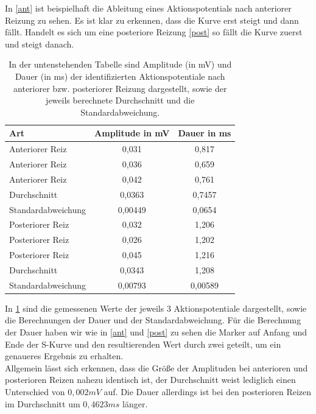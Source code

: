 \documentclass[11pt]{article}
\begin{document}
In \ref{ant} ist beispielhaft die Ableitung eines Aktionspotentials nach anteriorer Reizung zu sehen. Es ist klar zu erkennen, dass die Kurve erst steigt und dann fällt. Handelt es sich um eine posteriore Reizung \ref{post} so fällt die Kurve zuerst und steigt danach.

\begin{table}[H]
\caption{In der untenstehenden Tabelle sind Amplitude (in mV) und Dauer (in ms) der identifizierten Aktionspotentiale nach anteriorer bzw. posteriorer Reizung dargestellt, sowie der jeweils berechnete Durchschnitt und die Standardabweichung.}
\begin{center}
\begin{tabular}{l||c|c}
Art & Amplitude in mV & Dauer in ms \\
\hline\hline
Anteriorer Reiz & 0,031 & 0,817\\
Anteriorer Reiz & 0,036 & 0,659\\
Anteriorer Reiz & 0,042 & 0,761\\
\hline
Durchschnitt & 0,0363& 0,7457\\
Standardabweichung & 0,00449 &0,0654 \\
\hline\hline
Posteriorer Reiz & 0,032 & 1,206\\
Posteriorer Reiz & 0,026& 1,202\\
Posteriorer Reiz & 0,045 & 1,216\\
\hline
Durchschnitt & 0,0343 & 1,208\\
Standardabweichung & 0,00793& 0,00589
\end{tabular}
\end{center}
\label{werte}
\end{table}

In \ref{werte} sind die gemessenen Werte der jeweils 3 Aktionspotentiale dargestellt, sowie die Berechnungen der Dauer und der Standardabweichung. Für die Berechnung der Dauer haben wir wie in \ref{ant} und \ref{post} zu sehen die Marker auf Anfang und Ende der S-Kurve und den resultierenden Wert durch zwei geteilt, um ein genaueres Ergebnis zu erhalten.\\
Allgemein lässt sich erkennen, dass die Größe der Amplituden bei anterioren und posterioren Reizen nahezu identisch ist, der Durchschnitt weist lediglich einen Unterschied von $0,002 mV$ auf. Die Dauer allerdings ist bei den posterioren Reizen im Durchschnitt um $0,4623 ms$ länger.  
\end{document}
